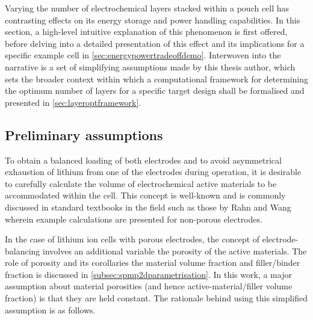

Varying the  number of electrochemical  layers stacked  within a pouch  cell has
contrasting effects  on its energy  storage and power handling  capabilities. In
this section,  a high-level  intuitive explanation of  this phenomenon  is first
offered, before  delving into  a detailed  presentation of  this effect  and its
implications for a specific  example cell in \cref{sec:energypowertradeoffdemo}.
Interwoven into the  narrative is a set of simplifying  assumptions made by this
thesis  author, which  sets the  broader  context within  which a  computational
framework for  determining the optimum  number of  layers for a  specific target
design shall be formalised and presented in \cref{sec:layeroptframework}.

\subsection{Preliminary assumptions}\label{subsec:layeroptassumptions}

To  obtain a  balanced  loading of  both electrodes  and  to avoid  asymmetrical
exhaustion  of lithium  from  one  of the  electrodes  during  operation, it  is
desirable to carefully calculate the  volume of electrochemical active materials
to be accommodated  within the cell. This concept is  well-known and is commonly
discussed  in  standard  textbooks in  the  field  such  as  those by  Rahn  and
Wang~\cite{Rahn2013} wherein  example calculations are presented  for non-porous
electrodes.

In  the  case  of  lithium  ion   cells  with  porous  electrodes,  the  concept
of  electrode-balancing  involves an  additional  variable  \viz{} the  porosity
of  the  active materials.  The  role  of  porosity  and its  corollaries  \ie{}
the  material  volume  fraction  and  filler/binder  fraction  is  discussed  in
\cref{subsec:spmp2dparametrisation}.  In this  work,  a  major assumption  about
material porosities  (and hence active-material/filler volume  fraction) is that
they are held constant. The rationale behind using this simplified assumption is
as follows.

